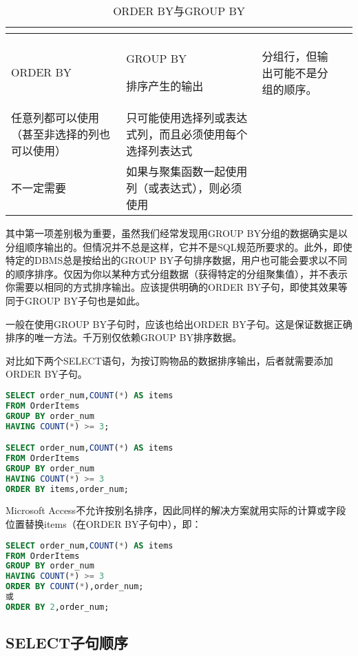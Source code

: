 \begin{longtable}{|m{180pt}|m{180pt}|}
\hline
{}
\tabularnewline\hline
\endhead

\caption{ORDER BY与GROUP BY}\\
\hline
ORDER BY	&GROUP BY
\endfirsthead

\endfoot

\endlastfoot
\hline
排序产生的输出	&分组行，但输出可能不是分组的顺序。\\
\hline
任意列都可以使用（甚至非选择的列也可以使用）&只可能使用选择列或表达式列，而且必须使用每个选择列表达式\\
\hline
不一定需要	&如果与聚集函数一起使用列（或表达式），则必须使用\\
\hline
\end{longtable}

其中第一项差别极为重要，虽然我们经常发现用GROUP BY分组的数据确实是以分组顺序输出的。但情况并不总是这样，它并不是SQL规范所要求的。此外，即使特定的DBMS总是按给出的GROUP BY子句排序数据，用户也可能会要求以不同的顺序排序。仅因为你以某种方式分组数据（获得特定的分组聚集值），并不表示你需要以相同的方式排序输出。应该提供明确的ORDER BY子句，即使其效果等同于GROUP BY子句也是如此。

一般在使用GROUP BY子句时，应该也给出ORDER BY子句。这是保证数据正确排序的唯一方法。千万别仅依赖GROUP BY排序数据。

对比如下两个SELECT语句，为按订购物品的数据排序输出，后者就需要添加ORDER BY子句。

\begin{lstlisting}[language=SQL]
SELECT order_num,COUNT(*) AS items
FROM OrderItems
GROUP BY order_num
HAVING COUNT(*) >= 3;

SELECT order_num,COUNT(*) AS items
FROM OrderItems
GROUP BY order_num
HAVING COUNT(*) >= 3
ORDER BY items,order_num;
\end{lstlisting}

Microsoft Access不允许按别名排序，因此同样的解决方案就用实际的计算或字段位置替换items（在ORDER BY子句中），即：

\begin{lstlisting}[language=SQL]
SELECT order_num,COUNT(*) AS items
FROM OrderItems
GROUP BY order_num
HAVING COUNT(*) >= 3
ORDER BY COUNT(*),order_num;
或
ORDER BY 2,order_num;
\end{lstlisting}

\subsection{SELECT子句顺序}


